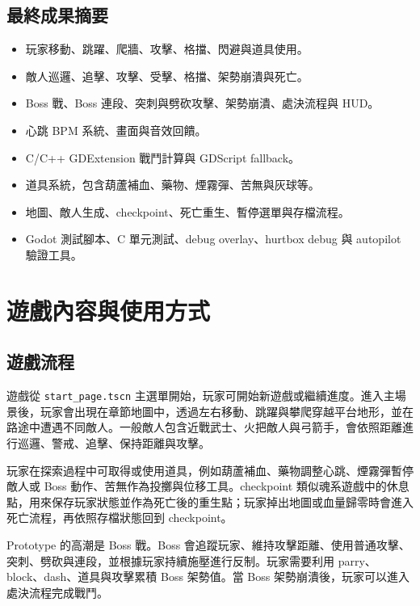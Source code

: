 \documentclass[12pt,a4paper]{article}
\begin{document}
\subsection{最終成果摘要}
\begin{itemize}[leftmargin=2em]
  \item 玩家移動、跳躍、爬牆、攻擊、格擋、閃避與道具使用。
  \item 敵人巡邏、追擊、攻擊、受擊、格擋、架勢崩潰與死亡。
  \item Boss 戰、Boss 連段、突刺與劈砍攻擊、架勢崩潰、處決流程與 HUD。
  \item 心跳 BPM 系統、畫面與音效回饋。
  \item C/C++ GDExtension 戰鬥計算與 GDScript fallback。
  \item 道具系統，包含葫蘆補血、藥物、煙霧彈、苦無與灰球等。
  \item 地圖、敵人生成、checkpoint、死亡重生、暫停選單與存檔流程。
  \item Godot 測試腳本、C 單元測試、debug overlay、hurtbox debug 與 autopilot 驗證工具。
\end{itemize}

\section{遊戲內容與使用方式}

\subsection{遊戲流程}
遊戲從 \texttt{start\_page.tscn} 主選單開始，玩家可開始新遊戲或繼續進度。進入主場景後，玩家會出現在章節地圖中，透過左右移動、跳躍與攀爬穿越平台地形，並在路途中遭遇不同敵人。一般敵人包含近戰武士、火把敵人與弓箭手，會依照距離進行巡邏、警戒、追擊、保持距離與攻擊。

玩家在探索過程中可取得或使用道具，例如葫蘆補血、藥物調整心跳、煙霧彈暫停敵人或 Boss 動作、苦無作為投擲與位移工具。checkpoint 類似魂系遊戲中的休息點，用來保存玩家狀態並作為死亡後的重生點；玩家掉出地圖或血量歸零時會進入死亡流程，再依照存檔狀態回到 checkpoint。

Prototype 的高潮是 Boss 戰。Boss 會追蹤玩家、維持攻擊距離、使用普通攻擊、突刺、劈砍與連段，並根據玩家持續施壓進行反制。玩家需要利用 parry、block、dash、道具與攻擊累積 Boss 架勢值。當 Boss 架勢崩潰後，玩家可以進入處決流程完成戰鬥。
\end{document}
